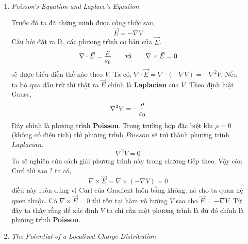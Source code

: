 \begin{enumerate}
\begin{problem}
Tìm điện thế bên trong và bên ngoài của mặt cầu bán kính là $R$. Có mật độ tích điện đều, chọn mốc ở vô cực.
\end{problem}

\begin{sol}
Từ định luật Gauss, ta có điện trường bên ngoài mặt cầu sẽ là:
\[
\vec{E} = \frac{q}{4\pi\ep_{0}r^2} \hat{r}
\]
Vì điện tích chỉ tồn tại trên mặt cầu nên điện trường bên trong mặt sẽ bằng không. Với những điểm nằm ngoài mặt cầu ta bao chúng lại bằng một mặt cầu lớn hơn có $(\vec{r} > R)$.
\[
V(\vec{r}) = - \int_{\infty}^{\vec{r}} \vec{E} \cdot \, d\vec{l} = - \int_{\infty}^{r} \frac{q}{4\pi\ep_{0}r^2}\hat{r} \cdot \, dr\hat{r}
\]
Vì $d\vec{l} = dr\,\hat{r} + r\,d\theta\,\hat{\theta} + r\sin\theta\,d\phi\,\hat{\phi}$ \,\,\,
vậy,
\[
V(\vec{r}) = \frac{q}{4\pi\ep_{0}r} \Big|_{\infty}^{\vec{r}} = \frac{q}{4\pi\ep_{0}\vec{r}}
\]
Với những điểm nằm trong mặt cầu ta sẽ tính như sau $(\vec{r}<R)$,
\[
V(\vec{r}) = - \int_{\infty}^{\vec{r}} \vec{E} \cdot \, d\vec{l} = - \int_{\infty}^{R} \vec{E} \cdot \, d\vec{l} - \int_{R}^{\vec{r}} \vec{E} \cdot \, d\vec{l}
\]
rõ ràng trong mặt cầu thì $\vec{E} = \vec{0}$ nên,
\[
V(\vec{r}) = - \int_{\infty}^{\vec{r}} \vec{E} \cdot \, d\vec{l} = - \int_{\infty}^{R} \frac{q}{4\pi\ep_{0}r^2}\hat{r} \cdot \, dr\hat{r} - \int_{R}^{\vec{r}} 0 \cdot \, dr\hat{r} = \frac{q}{4\pi\ep_{0}R}
\]
\end{sol}
\textbf{Nhận xét.} kết quả trên là hợp lý vì $\vec{E} = -\nabla V = 0$ nên rõ ràng $V$ phải là trường hằng với những điểm nằm trong mặt cầu.
\item \textit{Poisson's Equation and Laplace's Equation}

Trước đó ta đã chứng minh được công thức sau,
\[
\vec{E} = -\nabla V
\]
Câu hỏi đặt ra là, các phương trình cơ bản của $\vec{E}$.
\[
\nabla \cdot \vec{E} = \frac{\rho}{\varepsilon_{0}} \qquad \text{và} \qquad \nabla \times \vec{E} = 0
\]
sẽ được biểu diễn thế nào theo $V$. Ta có, $\nabla \cdot \vec{E} = \nabla \cdot (-\nabla V) = -\nabla^2 V$. Nếu ta bỏ qua dấu trừ thì thật ra $\vec{E}$ chính là \textbf{Laplacian} của $V$. Theo định luật Gauss,
\[
\nabla^2 V = -\frac{\rho}{\varepsilon_{0}}
\]
Đây chính là phương trình \textbf{Poisson}. Trong trường hợp đặc biệt khi $\rho = 0$\, (không có điện tích) thì phương trình $Poisson$ sẽ trở thành phương trình $Laplacian$.
\[
\nabla^{2} V = 0
\]
Ta sẽ nghiên cứu cách giải phương trình này trong chương tiếp theo. Vậy còn Curl thì sao ? ta có,
\[
\nabla \times \vec{E} = \nabla \times (-\nabla V) = 0
\]
điều này luôn đúng vì Curl của Gradient luôn bằng không, nó cho ta quan hệ quen thuộc. Có $\nabla \times \vec{E} = 0$ thì tồn tại hàm vô hướng $V$ sao cho $\vec{E} = -\nabla V$. Từ đây ta thấy rằng để xác định $V$ ta chỉ cần một phương trình là đủ đó chính là phương trình \textbf{Poisson}.
\item \textit{The Potential of a Localized Charge Distribution}


\end{enumerate}

